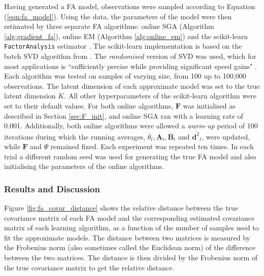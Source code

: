 \documentclass[msc,deptreport.inf]{infthesis} %
\newcommand{\matr}[1]{\mathbf{#1}}
\begin{document}
Having generated a FA model, observations were sampled according to Equation (\ref{eqn:fa_model}). Using the data, the parameters of the model were then estimated by three separate FA algorithms: online SGA (Algorithm \ref{alg:gradient_fa}), online EM (Algorithm \ref{alg:online_em}) and the scikit-learn \texttt{FactorAnalysis} estimator \cite{pedregosa2012}. The scikit-learn implementation is based on the batch SVD algorithm from \cite{barber2007}. The \emph{randomised} version of SVD was used, which for most applications is  ``sufficiently precise while providing significant speed gains" \cite{pedregosa2012}. Each algorithm was tested on samples of varying size, from 100 up to 100,000 observations. The latent dimension of each approximate model was set to the true latent dimension $K$. All other hyperparameters of the scikit-learn algorithm were set to their default values. For both online algorithms, $\matr{F}$ was initialised as described in Section \ref{sec:F_init}, and online SGA ran with a learning rate of 0.001. Additionally, both online algorithms were allowed a \emph{warm-up} period of 100 iterations during which the running averages, $\overline{\theta}_t, \overline{\matr{A}}_t, \overline{\matr{B}}_t$ and $\overline{\matr{d}^2}_t$, were updated, while $\matr{F}$ and $\Psi$ remained fixed. Each experiment was repeated ten times. In each trial a different random seed was used for generating the true FA model and also initialising the parameters of the online algorithms. 


\subsubsection{Results and Discussion}

Figure \ref{fig:fa_covar_distance} shows the relative distance between the true covariance matrix of each FA model and the corresponding estimated covariance matrix of each learning algorithm, as a function of the number of samples used to fit the approximate models. The distance between two matrices is measured by the Frobenius norm (also sometimes called the Euclidean norm) of the difference between the two matrices. The distance is then divided by the Frobenius norm of the true covariance matrix to get the relative distance. 
\end{document}

